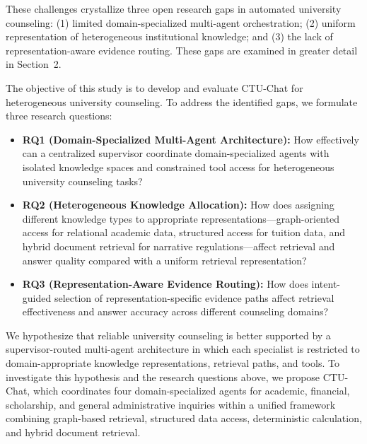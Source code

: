 These challenges crystallize three open research gaps in automated university counseling: (1) limited domain-specialized multi-agent orchestration; (2) uniform representation of heterogeneous institutional knowledge; and (3) the lack of representation-aware evidence routing. These gaps are examined in greater detail in Section~2.

The objective of this study is to develop and evaluate CTU-Chat for heterogeneous university counseling. To address the identified gaps, we formulate three research questions:
\begin{itemize}
    \setlength{\itemsep}{1.5pt}
    \setlength{\parsep}{0pt}
    \setlength{\parskip}{0pt}

    \item \textbf{RQ1 (Domain-Specialized Multi-Agent Architecture):}
    How effectively can a centralized supervisor coordinate domain-specialized agents with isolated knowledge spaces and constrained tool access for heterogeneous university counseling tasks?

    \item \textbf{RQ2 (Heterogeneous Knowledge Allocation):}
    How does assigning different knowledge types to appropriate representations---graph-oriented access for relational academic data, structured access for tuition data, and hybrid document retrieval for narrative regulations---affect retrieval and answer quality compared with a uniform retrieval representation?

    \item \textbf{RQ3 (Representation-Aware Evidence Routing):}
    How does intent-guided selection of representation-specific evidence paths affect retrieval effectiveness and answer accuracy across different counseling domains?
\end{itemize}

We hypothesize that reliable university counseling is better supported by a supervisor-routed multi-agent architecture in which each specialist is restricted to domain-appropriate knowledge representations, retrieval paths, and tools. To investigate this hypothesis and the research questions above, we propose CTU-Chat, which coordinates four domain-specialized agents for academic, financial, scholarship, and general administrative inquiries within a unified framework combining graph-based retrieval, structured data access, deterministic calculation, and hybrid document retrieval.


